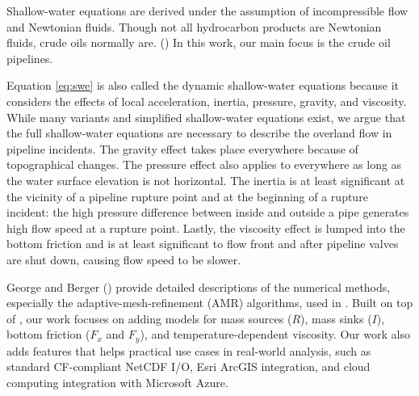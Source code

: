 Shallow-water equations are derived under the assumption of incompressible flow and Newtonian fluids. 
Though not all hydrocarbon products are Newtonian fluids, crude oils normally are. (\cite{Ronningsen2012, bryan_viscosity_2002}) 
In this work, our main focus is the crude oil pipelines. 

Equation \ref{eq:swe} is also called the dynamic shallow-water equations because it considers the effects of local acceleration, inertia, pressure, gravity, and viscosity.
While many variants and simplified shallow-water equations exist, we argue that the full shallow-water equations are necessary to describe the overland flow in pipeline incidents.
The gravity effect takes place everywhere because of topographical changes.
The pressure effect also applies to everywhere as long as the water surface elevation is not horizontal.
The inertia is at least significant at the vicinity of a pipeline rupture point and at the beginning of a rupture incident: the high pressure difference between inside and outside a pipe generates high flow speed at a rupture point.
Lastly, the viscosity effect is lumped into the bottom friction and is at least significant to flow front and after pipeline valves are shut down, causing flow speed to be slower.

George and Berger (\cite{George2011, Berger2011}) provide detailed descriptions of the numerical methods, especially the adaptive-mesh-refinement (AMR) algorithms, used in \geoclaw.
Built on top of \geoclaw, our work focuses on adding models for mass sources ($R$), mass sinks ($I$), bottom friction ($F_x$ and $F_y$), and temperature-dependent viscosity.
Our work also adds features that helps practical use cases in real-world analysis, such as standard CF-compliant NetCDF I/O, Esri ArcGIS integration, and cloud computing integration with Microsoft Azure.
